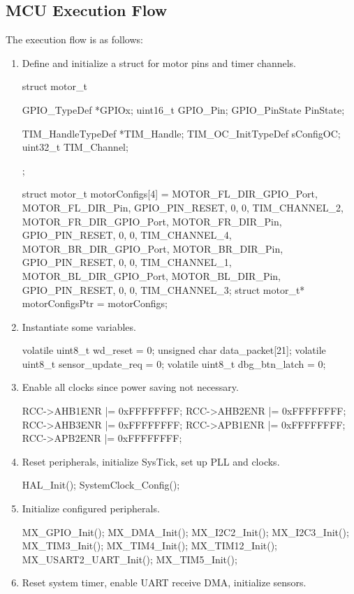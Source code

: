 \subsection{MCU Execution Flow}
The execution flow is as follows:
\begin{enumerate}
	\item Define and initialize a struct for motor pins and timer channels.
	\begin{clisting}
struct motor_t {
    GPIO_TypeDef *GPIOx;
    uint16_t GPIO_Pin;
    GPIO_PinState PinState;

    TIM_HandleTypeDef *TIM_Handle;
    TIM_OC_InitTypeDef sConfigOC;
    uint32_t TIM_Channel;
};

struct motor_t motorConfigs[4] = { 
    {MOTOR_FL_DIR_GPIO_Port, MOTOR_FL_DIR_Pin, GPIO_PIN_RESET, 0, {0}, TIM_CHANNEL_2}, 
    {MOTOR_FR_DIR_GPIO_Port, MOTOR_FR_DIR_Pin, GPIO_PIN_RESET, 0, {0}, TIM_CHANNEL_4}, 
    {MOTOR_BR_DIR_GPIO_Port, MOTOR_BR_DIR_Pin, GPIO_PIN_RESET, 0, {0}, TIM_CHANNEL_1}, 
    {MOTOR_BL_DIR_GPIO_Port, MOTOR_BL_DIR_Pin, GPIO_PIN_RESET, 0, {0}, TIM_CHANNEL_3}}; 
struct motor_t* motorConfigsPtr = motorConfigs;
	\end{clisting}
	\item Instantiate some variables.
	\begin{clisting}
volatile uint8_t wd_reset = 0;
unsigned char data_packet[21];
volatile uint8_t sensor_update_req = 0;
volatile uint8_t dbg_btn_latch = 0;
	\end{clisting}
	\item Enable all clocks since power saving not necessary.
	\begin{clisting}
RCC->AHB1ENR |= 0xFFFFFFFF;
RCC->AHB2ENR |= 0xFFFFFFFF;
RCC->AHB3ENR |= 0xFFFFFFFF;
RCC->APB1ENR |= 0xFFFFFFFF;
RCC->APB2ENR |= 0xFFFFFFFF;
	\end{clisting}
	\item Reset peripherals, initialize SysTick, set up PLL and clocks.
	\begin{clisting}
HAL_Init();
SystemClock_Config();
	\end{clisting}
	\item Initialize configured peripherals.
	\begin{clisting}
MX_GPIO_Init();
MX_DMA_Init();
MX_I2C2_Init();
MX_I2C3_Init();
MX_TIM3_Init();
MX_TIM4_Init();
MX_TIM12_Init();
MX_USART2_UART_Init();
MX_TIM5_Init();
	\end{clisting}
	\item Reset system timer, enable UART receive DMA, initialize sensors.

\end{enumerate}
